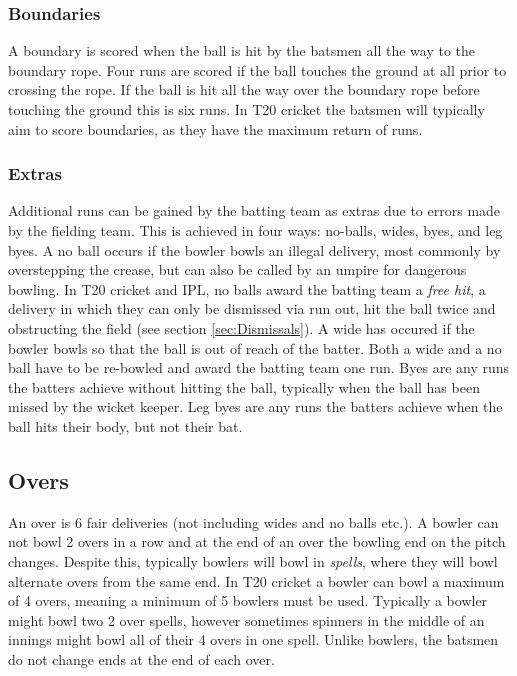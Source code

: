 \documentclass[12pt,a4paper]{report}
\theoremstyle{definition}
\begin{document}
\subsubsection{Boundaries} \label{sec:Boundaries}

A boundary is scored when the ball is hit by the batsmen all the way to the boundary rope.
Four runs are scored if the ball touches the ground at all prior to crossing the rope. 
If the ball is hit all the way over the boundary rope before touching the ground this is six runs. 
In T20 cricket the batsmen will typically aim to score boundaries, as they have the maximum return of runs.

\subsubsection{Extras}

Additional runs can be gained by the batting team as extras due to errors made by the fielding team. 
This is achieved in four ways: no-balls, wides, byes, and leg byes. 
A no ball occurs if the bowler bowls an illegal delivery, most commonly by overstepping the crease, but can also be called by an umpire for dangerous bowling.
In T20 cricket and IPL, no balls award the batting team a \emph{free hit}, a delivery in which they can only be dismissed via run out, hit the ball twice and obstructing the field (see section \ref{sec:Dismissals}).
A wide has occured if the bowler bowls so that the ball is out of reach of the batter.
Both a wide and a no ball have to be re-bowled and award the batting team one run.
Byes are any runs the batters achieve without hitting the ball, typically when the ball has been missed by the wicket keeper.
Leg byes are any runs the batters achieve when the ball hits their body, but not their bat.

\subsection{Overs} \label{sec:Overs}

An over is 6 fair deliveries (not including wides and no balls etc.).
A bowler can not bowl 2 overs in a row and at the end of an over the bowling end on the pitch changes. 
Despite this, typically bowlers will bowl in \emph{spells}, where they will bowl alternate overs from the same end.
In T20 cricket a bowler can bowl a maximum of 4 overs, meaning a minimum of 5 bowlers must be used. 
Typically a bowler might bowl two 2 over spells, however sometimes spinners in the middle of an innings might bowl all of their 4 overs in one spell.
Unlike bowlers, the batsmen do not change ends at the end of each over. 
\end{document}
